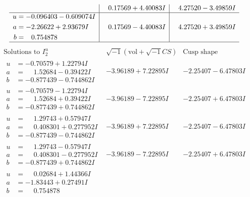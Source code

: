 \documentclass[1p]{elsarticle_modified}
\theoremstyle{definition}
\newcommand{\I}{\sqrt{-1}}
\begin{document}
$$\begin{array}{c|c|c}
 & \phantom{-}0.17569 + 4.40083 I & \phantom{-}4.27520 - 3.49859 I \\ \hline\begin{aligned}
u &= -0.096403 - 0.609074 I \\
a &= -2.26622 + 2.93679 I \\
b &= \phantom{-}0.754878\phantom{ +0.000000I}\end{aligned}
 & \phantom{-}0.17569 - 4.40083 I & \phantom{-}4.27520 + 3.49859 I\\
 \hline 
 \end{array}$$\newpage$$\begin{array}{c|c|c}  
\text{Solutions to }I^u_{2}& \I (\text{vol} + \sqrt{-1}CS) & \text{Cusp shape}\\
 \hline 
\begin{aligned}
u &= -0.70579 + 1.22794 I \\
a &= \phantom{-}1.52684 - 0.39422 I \\
b &= -0.877439 - 0.744862 I\end{aligned}
 & -3.96189 + 7.22895 I & -2.25407 - 6.47803 I \\ \hline\begin{aligned}
u &= -0.70579 - 1.22794 I \\
a &= \phantom{-}1.52684 + 0.39422 I \\
b &= -0.877439 + 0.744862 I\end{aligned}
 & -3.96189 - 7.22895 I & -2.25407 + 6.47803 I \\ \hline\begin{aligned}
u &= \phantom{-}1.29743 + 0.57947 I \\
a &= \phantom{-}0.408301 + 0.277952 I \\
b &= -0.877439 - 0.744862 I\end{aligned}
 & -3.96189 + 7.22895 I & -2.25407 - 6.47803 I \\ \hline\begin{aligned}
u &= \phantom{-}1.29743 - 0.57947 I \\
a &= \phantom{-}0.408301 - 0.277952 I \\
b &= -0.877439 + 0.744862 I\end{aligned}
 & -3.96189 - 7.22895 I & -2.25407 + 6.47803 I \\ \hline\begin{aligned}
u &= \phantom{-}0.02684 + 1.44366 I \\
a &= -1.83443 + 0.27491 I \\
b &= \phantom{-}0.754878\phantom{ +0.000000I}\end{aligned}

\end{array}$$
\end{document}

